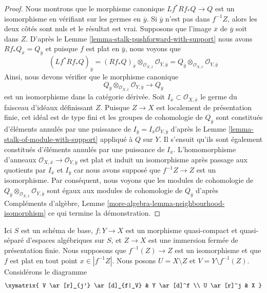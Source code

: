 \begin{proof}
Nous montrons que le morphisme canonique $Lf^*Rf_*Q \to Q$ est un isomorphisme
en vérifiant sur les germes en $\overline{y}$. Si $\overline{y}$ n'est pas
dans $f^{-1}Z$, alors les deux côtés sont nuls et le résultat est vrai.
Supposons que l'image $\overline{x}$ de $\overline{y}$ soit dans $Z$.
D'après le Lemme \ref{lemma-stalk-pushforward-with-support} nous avons
$Rf_*Q_{\overline{x}} = Q_{\overline{y}}$ et puisque $f$ est plat
en $\overline{y}$, nous voyons que
$$
(Lf^*Rf_*Q)_{\overline{y}} =
(Rf_*Q)_{\overline{x}}
\otimes_{\mathcal{O}_{X, \overline{x}}}
\mathcal{O}_{Y, \overline{y}} =
Q_{\overline{y}} \otimes_{\mathcal{O}_{X, \overline{x}}}
\mathcal{O}_{Y, \overline{y}}
$$
Ainsi, nous devons vérifier que le morphisme canonique
$$
Q_{\overline{y}} \otimes_{\mathcal{O}_{X, \overline{x}}}
\mathcal{O}_{Y, \overline{y}}
\longrightarrow Q_{\overline{y}}
$$
est un isomorphisme dans la catégorie dérivée. Soit
$I_{\overline{x}} \subset \mathcal{O}_{X, \overline{x}}$ le
germe du faisceau d'idéaux définissant $Z$. Puisque $Z \to X$ est localement de
présentation finie, cet idéal est de type fini et les
groupes de cohomologie de $Q_{\overline{y}}$
sont constitués d'éléments annulés par une puissance de $I_{\overline{y}} = I_{\overline{x}}\mathcal{O}_{Y, \overline{y}}$ d'après le Lemme \ref{lemma-stalk-of-module-with-support} appliqué à $Q$ sur $Y$. Il s'ensuit qu'ils sont également constitués d'éléments annulés par une puissance de $I_{\overline{x}}$. 
L'homomorphisme d'anneaux 
$\mathcal{O}_{X, \overline{x}} \to \mathcal{O}_{Y, \overline{y}}$ 
est plat et induit un isomorphisme après passage aux quotients par 
$I_{\overline{x}}$ et $I_{\overline{y}}$ car nous avons supposé que 
$f^{-1}Z \to Z$ est un isomorphisme. Par conséquent, nous voyons que 
les modules de cohomologie de 
$Q_{\overline{y}} \otimes_{\mathcal{O}_{X, \overline{x}}}
\mathcal{O}_{Y, \overline{y}}$ 
sont égaux aux modules de cohomologie de $Q_{\overline{y}}$ d'après 
Compléments d'algèbre, Lemme \ref{more-algebra-lemma-neighbourhood-isomorphism} 
ce qui termine la démonstration. 
\end{proof}

\begin{situation}
\label{situation-formal-glueing}
Ici $S$ est un schéma de base, $f : Y \to X$ est un morphisme quasi-compact et quasi-séparé d'espaces algébriques sur $S$, et $Z \to X$ est une immersion fermée de présentation finie. Nous supposons que $f^{-1}(Z) \to Z$ est un isomorphisme et que $f$ est plat en tout point $x \in |f^{-1}Z|$. Nous posons $U = X \setminus Z$ et $V = Y \setminus f^{-1}(Z)$.
Considérons le diagramme
$$
\xymatrix{
V \ar[r]_{j'} \ar[d]_{f|_V} & Y \ar[d]^f \\
U \ar[r]^j & X
}
$$
\end{situation}


